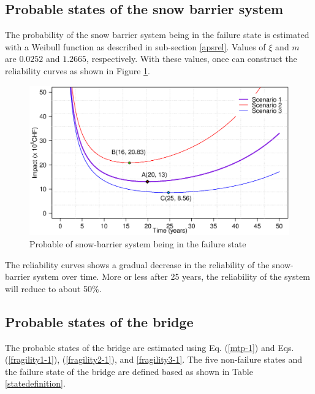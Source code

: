 \documentclass[]{article}
\begin{document}
\subsection{Probable states of the snow barrier system}
The probability of the snow barrier system being in the failure state
is estimated with a Weibull function as described in sub-section \ref{apsrel}.
Values of $\xi$ and $m$ are $0.0252$ and $1.2665$, respectively. With
these values, once can construct the reliability curves as shown in
Figure \ref{reliability-snowbarriers}.

\begin{figure}[H]
\centering{}\includegraphics[width=0.8\linewidth]{fig2}
\caption{Probable of snow-barrier system being in the failure state}
\label{reliability-snowbarriers} 
\end{figure}

The reliability curves shows a gradual decrease in the reliability
of the snow-barrier system over time. More or less after 25 years,
the reliability of the system will reduce to about 50\%.

\subsection{Probable states of the bridge}

The probable states of the bridge are estimated using Eq.
(\ref{mtp-1}) and Eqs. (\ref{fragility1-1}), (\ref{fragility2-1}),
and \ref{fragility3-1}. The five non-failure states and the failure
state of the bridge are defined based as shown in Table \ref{statedefinition}.
\end{document}
